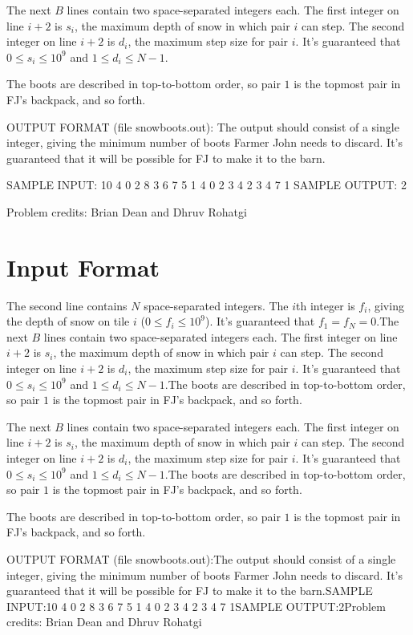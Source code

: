 \documentclass[12pt]{article}
\begin{document}
The next $B$ lines contain two space-separated integers each. The first integer
on line $i+2$ is $s_i$, the maximum depth of snow in which pair $i$ can step.
The second integer on line $i+2$ is $d_i$, the maximum step size for pair $i$.
It's guaranteed that $0 \leq s_i \leq 10^9$ and $1 \leq d_i \leq N-1$.

The boots are described in top-to-bottom order, so pair $1$ is the topmost pair
in FJ's backpack, and so forth.

OUTPUT FORMAT (file snowboots.out):
The output should consist of a single integer, giving the minimum number of
boots Farmer John needs to discard. It's guaranteed that it will be possible for FJ to make it to the barn.

SAMPLE INPUT:
10 4
0 2 8 3 6 7 5 1 4 0
2 3
4 2
3 4
7 1
SAMPLE OUTPUT: 
2


Problem credits: Brian Dean and Dhruv Rohatgi



\section*{Input Format}
The second line contains $N$ space-separated integers.  The $i$th integer is
$f_i$, giving the depth of snow on tile $i$ ($0 \leq f_i \leq 10^9$). It's
guaranteed that $f_1 = f_N = 0$.The next $B$ lines contain two space-separated integers each. The first integer
on line $i+2$ is $s_i$, the maximum depth of snow in which pair $i$ can step.
The second integer on line $i+2$ is $d_i$, the maximum step size for pair $i$.
It's guaranteed that $0 \leq s_i \leq 10^9$ and $1 \leq d_i \leq N-1$.The boots are described in top-to-bottom order, so pair $1$ is the topmost pair
in FJ's backpack, and so forth.

The next $B$ lines contain two space-separated integers each. The first integer
on line $i+2$ is $s_i$, the maximum depth of snow in which pair $i$ can step.
The second integer on line $i+2$ is $d_i$, the maximum step size for pair $i$.
It's guaranteed that $0 \leq s_i \leq 10^9$ and $1 \leq d_i \leq N-1$.The boots are described in top-to-bottom order, so pair $1$ is the topmost pair
in FJ's backpack, and so forth.

The boots are described in top-to-bottom order, so pair $1$ is the topmost pair
in FJ's backpack, and so forth.

OUTPUT FORMAT (file snowboots.out):The output should consist of a single integer, giving the minimum number of
boots Farmer John needs to discard. It's guaranteed that it will be possible for FJ to make it to the barn.SAMPLE INPUT:10 4
0 2 8 3 6 7 5 1 4 0
2 3
4 2
3 4
7 1SAMPLE OUTPUT:2Problem credits: Brian Dean and Dhruv Rohatgi
\end{document}
